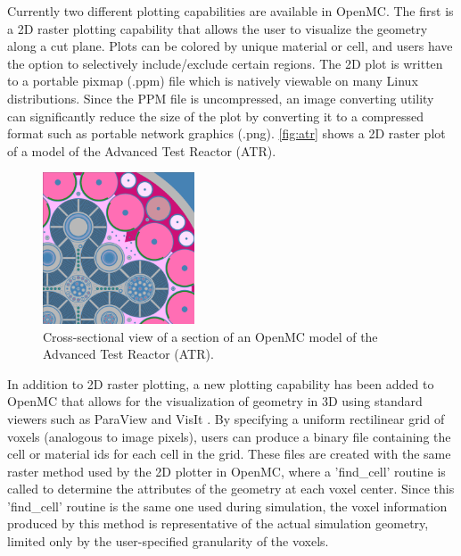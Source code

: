 \documentclass[5p,authoryear]{elsarticle}
\begin{document}
Currently two different plotting capabilities are available in OpenMC. The first
is a 2D raster plotting capability that allows the user to visualize the
geometry along a cut plane. Plots can be colored by unique material or cell, and
users have the option to selectively include/exclude certain regions. The 2D
plot is written to a portable pixmap (.ppm) file which is natively viewable on
many Linux distributions. Since the PPM file is uncompressed, an image
converting utility can significantly reduce the size of the plot by converting
it to a compressed format such as portable network graphics
(.png). \autoref{fig:atr} shows a 2D raster plot of a model of the Advanced Test
Reactor (ATR).
\begin{figure}[htb]
  \centering
  \includegraphics[width=0.4\textwidth]{images/atr.png}
  \caption{Cross-sectional view of a section of an OpenMC model of the Advanced
    Test Reactor (ATR).}
  \label{fig:atr}
\end{figure}

In addition to 2D raster plotting, a new plotting capability has been added to
OpenMC that allows for the visualization of geometry in 3D using standard
viewers such as ParaView \citep{squillicote-2007} and VisIt \citep{visit-2005}. By
specifying a uniform rectilinear grid of voxels (analogous to image pixels),
users can produce a binary file containing the cell or material ids for each
cell in the grid.  These files are created with the same raster method used by
the 2D plotter in OpenMC, where a 'find\_cell' routine is called to determine
the attributes of the geometry at each voxel center.  Since this 'find\_cell'
routine is the same one used during simulation, the voxel information produced
by this method is representative of the actual simulation geometry, limited only
by the user-specified granularity of the voxels.
\end{document}
